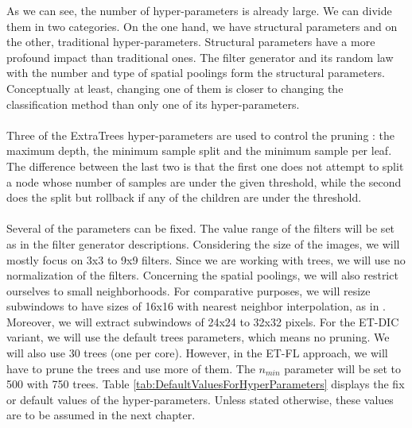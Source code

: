 \documentclass[a4paper]{report}
\newlength{\larg}
\begin{document}
	As we can see, the number of hyper-parameters is already large. We can divide them in two categories. On the one hand, we have structural parameters and on the other, traditional hyper-parameters. Structural parameters have a more profound impact than traditional ones. The filter generator and its random law with the number and type of spatial poolings form the structural parameters. Conceptually at least, changing one of them is closer to changing the classification method than only one of its hyper-parameters.
	\paragraph{}
	Three of the ExtraTrees hyper-parameters are used to control the pruning : the maximum depth, the minimum sample split and the minimum sample per leaf. The difference between the last two is that the first one does not attempt to split a node whose number of samples are under the given threshold, while the second does the split but rollback if any of the children are under the threshold. 
	\paragraph{}
	Several of the parameters can be fixed. The value range of the filters will be set as in the filter generator descriptions. Considering the size of the images, we will mostly focus on 3x3 to 9x9 filters. Since we are working with trees, we will use no normalization of the filters. Concerning the spatial poolings, we will also restrict ourselves to small neighborhoods. For comparative purposes, we will resize subwindows to have sizes of 16x16 with nearest neighbor interpolation, as in \cite{base}. Moreover, we will extract subwindows of 24x24 to 32x32 pixels. For the ET-DIC variant, we will use the default trees parameters, which means no pruning. We will also use 30 trees (one per core). However, in the ET-FL approach, we will have to prune the trees and use more of them. The $n_{min}$ parameter will be set to 500 with 750 trees. Table \ref{tab:DefaultValuesForHyperParameters} displays the fix or default values of the hyper-parameters. Unless stated otherwise, these values are to be assumed in the next chapter.
	
\end{document}
